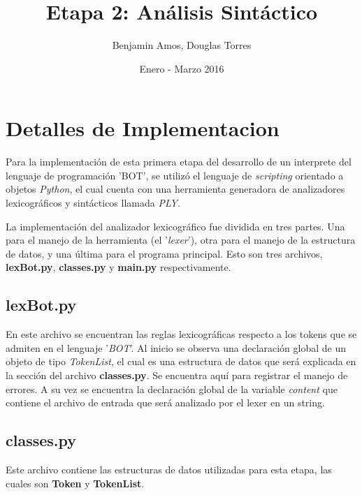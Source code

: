 \documentclass[a4paper, 10pt]{article}
\title{Etapa 2: Análisis Sintáctico}
\date{Enero - Marzo 2016}
\author{Benjamin Amos, Douglas Torres}
\begin{document}
	
	\maketitle
	\newpage
	
	\section{Detalles de Implementacion}
		
		\par	
		\medskip	
		Para la implementación de esta
		primera etapa del desarrollo de un interprete
		del lenguaje de programación 'BOT', se utilizó
		el lenguaje de \textit{scripting} orientado a objetos
		\emph{Python}, el cual cuenta con una herramienta
		generadora de analizadores lexicográficos y sintácticos
		llamada \emph{PLY}.
		
		\par
		\medskip
		La implementación del analizador lexicográfico fue dividida
		en tres partes. Una para el manejo de la herramienta (el '\emph{lexer}'),
		otra para el manejo de la estructura de datos, y una última para el 
		programa principal. Esto son tres archivos, \textbf{lexBot.py}, \textbf{classes.py}
		y \textbf{main.py} respectivamente.
		
		\subsection{lexBot.py}
		
			\par
			\medskip
			En este archivo se encuentran las reglas lexicográficas respecto a los tokens
			que se admiten en el lenguaje '\emph{BOT}'. Al inicio se observa una declaración
			global de un objeto de tipo \textit{TokenList}, el cual es una estructura de datos
			que será explicada en la sección del archivo \textbf{classes.py}. Se encuentra
			aquí para registrar el manejo de errores. A su vez se encuentra la declaración global
			de la variable \textit{content} que contiene el archivo de entrada que será analizado
			por el lexer en un string. 
			
		\subsection{classes.py}
		
			\par
			\medskip
			Este archivo contiene las estructuras de datos utilizadas para esta etapa, las cuales
			son \textbf{Token} y \textbf{TokenList}.
			
\end{document}
